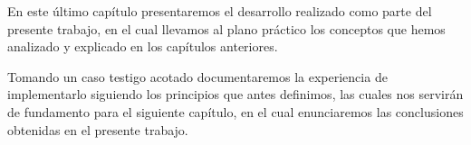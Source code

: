 En este último capítulo presentaremos el desarrollo realizado como parte del presente trabajo, en el cual llevamos al plano práctico los conceptos que hemos analizado y explicado en los capítulos anteriores.

Tomando un caso testigo acotado documentaremos la experiencia de implementarlo siguiendo los principios que antes definimos, las cuales nos servirán de fundamento para el siguiente capítulo, en el cual enunciaremos las conclusiones obtenidas en el presente trabajo.
